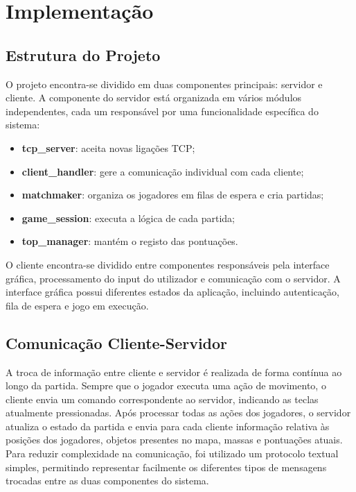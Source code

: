\documentclass[11pt,a4paper]{article}
\begin{document}
\newpage 


\section{Implementação}

\subsection{Estrutura do Projeto}
O projeto encontra-se dividido em duas componentes principais: servidor e cliente.
A componente do servidor está organizada em vários módulos independentes, cada um responsável por uma funcionalidade específica do sistema:
\begin{itemize}
    \item \textbf{tcp\_server}: aceita novas ligações TCP;
    \item \textbf{client\_handler}: gere a comunicação individual com cada cliente;
    \item \textbf{matchmaker}: organiza os jogadores em filas de espera e cria partidas;
    \item \textbf{game\_session}: executa a lógica de cada partida;
    \item \textbf{top\_manager}: mantém o registo das pontuações.
\end{itemize}
O cliente encontra-se dividido entre componentes responsáveis pela interface gráfica, processamento do input do utilizador e comunicação com o servidor.
A interface gráfica possui diferentes estados da aplicação, incluindo autenticação, fila de espera e jogo em execução.

\subsection{Comunicação Cliente-Servidor}
A troca de informação entre cliente e servidor é realizada de forma contínua ao longo da partida. Sempre que o jogador executa uma ação de movimento, o cliente envia um comando correspondente ao servidor, indicando as teclas atualmente pressionadas.
Após processar todas as ações dos jogadores, o servidor atualiza o estado da partida e envia para cada cliente informação relativa às posições dos jogadores, objetos presentes no mapa, massas e pontuações atuais.
Para reduzir complexidade na comunicação, foi utilizado um protocolo textual simples, permitindo representar facilmente os diferentes tipos de mensagens trocadas entre as duas componentes do sistema.
\end{document}
